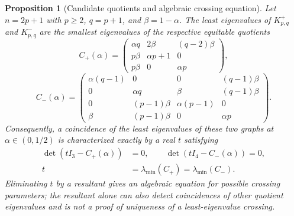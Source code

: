 \documentclass[11pt]{amsart}
\newtheorem{proposition}[theorem]{Proposition}
\theoremstyle{definition}
\begin{document}
\begin{proposition}[Candidate quotients and algebraic crossing equation]\label{prop:quotients}
Let $n=2p+1$ with $p\ge2$, $q=p+1$, and $\beta=1-\alpha$. The least eigenvalues of $K_{p,q}^{+}$ and $K_{p,q}^{-}$ are the smallest eigenvalues of the respective equitable quotients
\begin{equation}\label{eq:plusquot}
 C_+(\alpha)=
 \begin{pmatrix}
 \alpha q&2\beta&(q-2)\beta\\
 p\beta&\alpha p+1&0\\
 p\beta&0&\alpha p
 \end{pmatrix},
\end{equation}
\begin{equation}\label{eq:minusquot}
 C_-(\alpha)=
 \begin{pmatrix}
 \alpha(q-1)&0&0&(q-1)\beta\\
 0&\alpha q&\beta&(q-1)\beta\\
 0&(p-1)\beta&\alpha(p-1)&0\\
 \beta&(p-1)\beta&0&\alpha p
 \end{pmatrix}.
\end{equation}
Consequently, a coincidence of the \emph{least} eigenvalues of these two graphs at $\alpha\in(0,1/2)$ is characterized exactly by a real $t$ satisfying
\begin{equation}\label{eq:crossover}
\begin{aligned}
\det(tI_3-C_+(\alpha))&=0,\qquad
\det(tI_4-C_-(\alpha))=0,\\
 t&=\lambda_{\min}(C_+)=\lambda_{\min}(C_-).
\end{aligned}
\end{equation}
Eliminating $t$ by a resultant gives an algebraic equation for possible crossing parameters; the resultant alone can also detect coincidences of \emph{other} quotient eigenvalues and is not a proof of uniqueness of a least-eigenvalue crossing.
\end{proposition}
\end{document}
